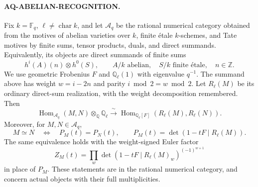 \paragraph{AQ-ABELIAN-RECOGNITION.}
Fix $k=\mathbb F_q$, $\ell\ne\operatorname{char}k$,
and let $\mathcal A_q$ be the rational numerical
category obtained from the motives of abelian
varieties over $k$, finite \'etale $k$-schemes, and
Tate motives by finite sums, tensor products,
duals, and direct summands. Equivalently, its
objects are direct summands of finite sums
\[
 h^i(A)(n)\otimes h^0(S),\qquad
 A/k\text{ abelian},\quad S/k\text{ finite \'etale},
 \quad n\in\mathbb Z.
\]
We use geometric Frobenius $F$ and
$\mathbb Q_\ell(1)$ with eigenvalue $q^{-1}$.
The summand above has weight $w=i-2n$ and
parity $i\bmod2=w\bmod2$.
Let $R_\ell(M)$ be its ordinary direct-sum
realization, with the weight decomposition remembered.
Then
\[
 \operatorname{Hom}_{\mathcal A_q}(M,N)\otimes_{\mathbb Q}\mathbb Q_\ell
 \xrightarrow{\ \sim\ }
 \operatorname{Hom}_{\mathbb Q_\ell[F]}
       (R_\ell(M),R_\ell(N)).                         \tag{AQ.15}
\]
Moreover, for $M,N\in\mathcal A_q$,
\[
 M\simeq N\quad\Longleftrightarrow\quad
 P_M(t)=P_N(t),\qquad
 P_M(t)=\det(1-tF\mid R_\ell(M)).                    \tag{AQ.16}
\]
The same equivalence holds with the weight-signed
Euler factor
\[
 Z_M(t)=\prod_w
 \det(1-tF\mid R_\ell(M)_w)^{(-1)^{w+1}}            \tag{AQ.17}
\]
in place of $P_M$. These statements are in the
rational numerical category, and concern actual
objects with their full multiplicities.

